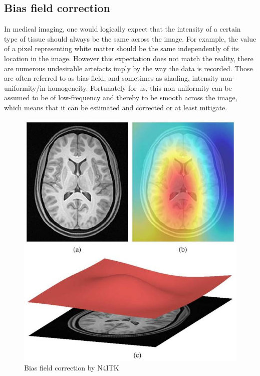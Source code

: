 \subsection{Bias field correction}
In medical imaging, one would logically expect that the intensity of a certain type of tissue should always be the same across the image. For example, the value of a pixel representing white matter should be the same independently of its location in the image. However this expectation does not match the reality, there are numerous undesirable artefacts imply by the way the data is recorded. Those are often referred to as bias field, and sometimes as shading, intensity non-uniformity/in-homogeneity.  Fortunately for us, this non-uniformity can be assumed to be of low-frequency and thereby to be smooth across the image, which means that it can be estimated and corrected or at least mitigate.
\begin{figure}
 \centering
 \includegraphics[width=.9\linewidth]{figures/preprocessing/N4_explain.jpeg}
 \captionsetup{width=.9\linewidth}
 \caption[N4]{Bias field correction by N4ITK\footnotemark}
 \label{fig:N4_explain}
\end{figure}

